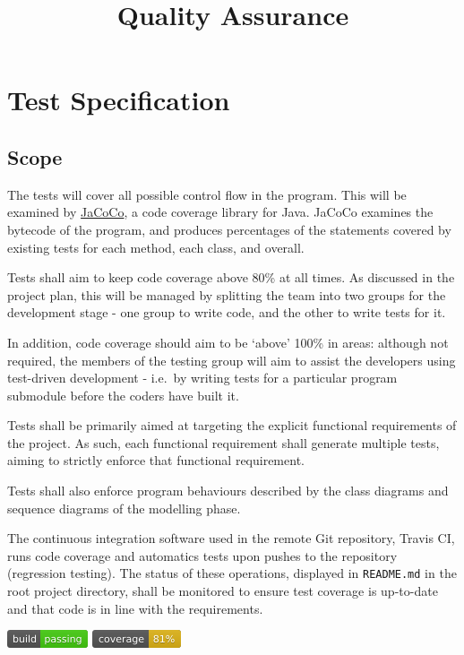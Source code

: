\documentclass[11pt]{article}
\title{Quality Assurance}
\date{}
\begin{document}
\maketitle
\tableofcontents
\newpage

\section{Test Specification}\label{test-specification}

\subsection{Scope}\label{scope}

The tests will cover all possible control flow in the program. This will
be examined by \href{http://eclemma.org/jacoco/}{JaCoCo}, a code
coverage library for Java. JaCoCo examines the bytecode of the program,
and produces percentages of the statements covered by existing tests for
each method, each class, and overall.

Tests shall aim to keep code coverage above 80\% at all times. As
discussed in the project plan, this will be managed by splitting the
team into two groups for the development stage - one group to write
code, and the other to write tests for it.

In addition, code coverage should aim to be `above' 100\% in areas:
although not required, the members of the testing group will aim to
assist the developers using test-driven development - i.e.~by writing
tests for a particular program submodule before the coders have built
it.

Tests shall be primarily aimed at targeting the explicit functional
requirements of the project. As such, each functional requirement shall
generate multiple tests, aiming to strictly enforce that functional
requirement.

Tests shall also enforce program behaviours described by the class
diagrams and sequence diagrams of the modelling phase.

The continuous integration software used in the remote Git repository,
Travis CI, runs code coverage and automatics tests upon pushes to the
repository (regression testing). The status of these operations,
displayed in \texttt{README.md} in the root project directory, shall be
monitored to ensure test coverage is up-to-date and that code is in line
with the requirements.

\begin{center}
\includegraphics{build-passing} \includegraphics{code-coverage}
\end{center}
\end{document}
